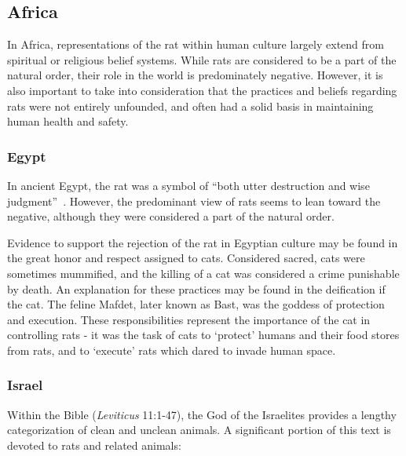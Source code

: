\documentclass[12pt]{article}
\begin{document}
\subsection{Africa} \label{Africa}

In Africa, representations of the rat within human culture largely extend from spiritual or religious belief systems. While rats are considered to be a part of the natural order, their role in the world is predominately negative. However, it is also important to take into consideration that the practices and beliefs regarding rats were not entirely unfounded, and often had a solid basis in maintaining human health and safety.

\subsubsection{Egypt} \label{Egypt}

In ancient Egypt, the rat was a symbol of ``both utter destruction and wise judgment''~\cite{ONeill}. However, the predominant view of rats seems to lean toward the negative, although they were considered a part of the natural order.

Evidence to support the rejection of the rat in Egyptian culture may be found in the great honor and respect assigned to cats. Considered sacred, cats were sometimes mummified, and the killing of a cat was considered a crime punishable by death. An explanation for these practices may be found in the deification if the cat. The feline Mafdet, later known as Bast, was the goddess of protection and execution. These responsibilities represent the importance of the cat in controlling rats - it was the task of cats to `protect' humans and their food stores from rats, and to `execute' rats which dared to invade human space.

\subsubsection{Israel} \label{Israel}

Within the Bible (\textit{Leviticus} 11:1-47), the God of the Israelites provides a lengthy categorization of clean and unclean animals. A significant portion of this text is devoted to rats and related animals:
\end{document}
